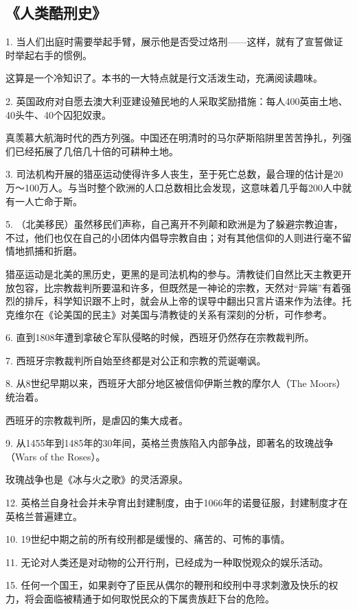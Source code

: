 \subsection{《人类酷刑史》}

1. 当人们出庭时需要举起手臂，展示他是否受过烙刑——这样，就有了宣誓做证时举起右手的惯例。

这算是一个冷知识了。本书的一大特点就是行文活泼生动，充满阅读趣味。

2. 英国政府对自愿去澳大利亚建设殖民地的人采取奖励措施：每人400英亩土地、40头牛、40个囚犯奴隶。

真羡慕大航海时代的西方列强。中国还在明清时的马尔萨斯陷阱里苦苦挣扎，列强们已经拓展了几倍几十倍的可耕种土地。

3. 司法机构开展的猎巫运动使得许多人丧生，至于死亡总数，最合理的估计是20万～100万人。与当时整个欧洲的人口总数相比会发现，这意味着几乎每200人中就有一人亡命于斯。

5. （北美移民）虽然移民们声称，自己离开不列颠和欧洲是为了躲避宗教迫害，不过，他们也仅在自己的小团体内倡导宗教自由；对有其他信仰的人则进行毫不留情地抓捕和折磨。

猎巫运动是北美的黑历史，更黑的是司法机构的参与。清教徒们自然比天主教更开放包容，比宗教裁判所要温和许多，但既然是一神论的宗教，天然对“异端”有着强烈的排斥，科学知识跟不上时，就会从上帝的误导中翻出只言片语来作为法律。托克维尔在《论美国的民主》对美国与清教徒的关系有深刻的分析，可作参考。

6. 直到1808年遭到拿破仑军队侵略的时候，西班牙仍然存在宗教裁判所。

7. 西班牙宗教裁判所自始至终都是对公正和宗教的荒诞嘲讽。

8. 从8世纪早期以来，西班牙大部分地区被信仰伊斯兰教的摩尔人（The Moors）统治着。

西班牙的宗教裁判所，是虐囚的集大成者。

9. 从1455年到1485年的30年间，英格兰贵族陷入内部争战，即著名的玫瑰战争（Wars of the Roses）。

玫瑰战争也是《冰与火之歌》的灵活源泉。

12. 英格兰自身社会并未孕育出封建制度，由于1066年的诺曼征服，封建制度才在英格兰普遍建立。


10. 19世纪中期之前的所有绞刑都是缓慢的、痛苦的、可怖的事情。

11. 无论对人类还是对动物的公开行刑，已经成为一种取悦观众的娱乐活动。

15. 任何一个国王，如果剥夺了臣民从偶尔的鞭刑和绞刑中寻求刺激及快乐的权力，将会面临被精通于如何取悦民众的下属贵族赶下台的危险。

